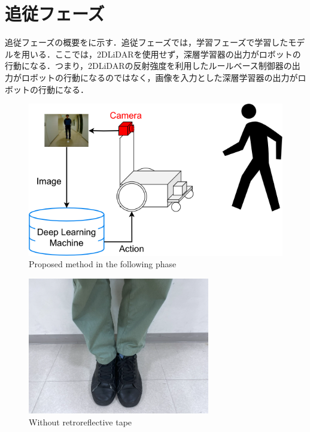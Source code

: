 
\section{追従フェーズ}

  追従フェーズの概要をに示す．追従フェーズでは，学習フェーズで学習したモデルを用いる．ここでは，2DLiDARを使用せず，深層学習器の出力がロボットの行動になる．つまり，2DLiDARの反射強度を利用したルールベース制御器の出力がロボットの行動になるのではなく，画像を入力とした深層学習器の出力がロボットの行動になる．

  \begin{figure}[h]
    \centering
    \includegraphics[keepaspectratio, scale=0.45] {images/RobotGuidance_following_system.png}
    \captionsetup{justification=raggedright} %
    \caption{Proposed method in the following phase}
    \label{Fig:RobotGuidance_following_system}
  \end{figure}

  \begin{figure}[h]
    \centering
    \includegraphics[keepaspectratio, scale=0.55] {images/RobotGuidance_following_phase_leg.png}
    \captionsetup{justification=raggedright} %
    \caption{Without retroreflective tape}
    \label{Fig:RobotGuidance_following_phase_leg}
  \end{figure}

\newpage
